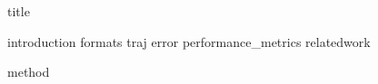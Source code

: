 \documentclass{article}
\begin{document}
{title}

\frontmatter

\tableofcontents

\listoffigures
\listoftables

\mainmatter

{introduction}
{formats}
{traj}
{error}
{performance_metrics}
{relatedwork}

{method}

\newpage
\printbibliography[heading = bibintoc]  %

\end{document}
